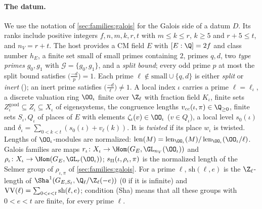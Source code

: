 \paragraph{The datum.}
We use the notation of \cref{sec:families:galois} for the Galois side of a datum $D$. Its ranks include
positive integers $f,n,m,k,r,t$ with $m\le k\le r$, $k\ge5$ and $r+5\le t$, and $n_V=r+t$. The host provides a CM field $E$ with
$[E:\Q]=2f$ and class number $h_E$, a finite set $\mathrm{small}$ of small primes containing $2$, primes $q,d$,
two \emph{type primes} $g_0,g_1$ with $\mathcal G=\{g_0,g_1\}$, and a \emph{split bound}; every odd prime $p$ at most
the split bound satisfies $\bigl(\frac{-d}{p}\bigr)=1$. Each prime $\ell\notin\mathrm{small}\cup\{q,d\}$ is either
\emph{split} or \emph{inert} (); an inert prime
satisfies $\bigl(\frac{-d}{\ell}\bigr)\ne1$. A local index $\iota$ carries a prime $\ell=\ell_\iota$, a discrete
valuation ring $\OO_\iota$ finite over $\Z_\ell$ with fraction field $K_\iota$, finite sets
$Z^{\mathrm{good}}_\iota\subseteq Z_\iota\subseteq X_\iota$ of eigensystems, the congruence lengths
$\linkNadmvcc(\iota,\pi)\in\Q_{\ge0}$, finite sets $S_\iota,Q_\iota$ of places of $E$ with elements
$\zeta_\iota(v)\in\OO_\iota$ ($v\in Q_\iota$), a local level $s_0(\iota)$ and
$\delta_\iota=\sum_{0<k<t}(s_0(\iota)+v_\ell(k))$. It is \emph{twisted} if its place $w_\iota$ is twisted. Lengths of
$\OO_\iota$-modules are normalized: $\linkNadmlen(M)=\linkNadmlen_{\OO_\iota}(M)/\linkNadmlen_{\OO_\iota}(\OO_\iota/\ell)$.
Galois families are maps $r_\iota\colon X_\iota\to\Hom(G_E,\GL_{n_V}(\OO_\iota))$ and $\rho_\iota\colon
X_\iota\to\Hom(G_E,\GL_r(\OO_\iota))$; $s_{\Pi}(\iota,\rho_\iota,\pi)$ is the normalized length of the Selmer
group of $\rho_{\iota,\pi}$ of \cref{sec:families:galois}. For a prime $\ell$, $\mathrm{sh}(\ell,e)$ is the
$\Z_\ell$-length of $\Sha^1(G_{E,S_\ell},\Q_\ell/\Z_\ell(-e))$ ($0$ if it is infinite) and $\mathrm{VV}(\ell)=\sum_{0<e<t}
\mathrm{sh}(\ell,e)$; condition (Sha) means that all these groups with $0<e<t$ are finite, for every prime $\ell$.

